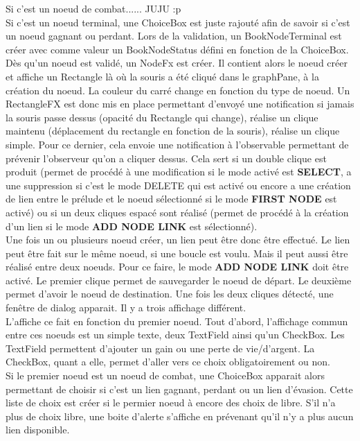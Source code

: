 		Si c'est un noeud de combat...... JUJU  :p\\


		Si c'est un noeud terminal, une ChoiceBox est juste rajouté afin de savoir si c'est un noeud gagnant ou perdant. Lors de la validation, un BookNodeTerminal est créer avec comme valeur un BookNodeStatus défini en fonction de la ChoiceBox.\\

		Dès qu'un noeud est validé, un NodeFx est créer. Il contient alors le noeud créer et affiche un Rectangle là où la souris a été cliqué dans le graphPane, à la création du noeud. La couleur du carré change en fonction du type de noeud. Un RectangleFX est donc mis en place permettant d'envoyé une notification si jamais la souris passe dessus (opacité du Rectangle qui change), réalise un clique maintenu (déplacement du rectangle en fonction de la souris), réalise un clique simple. Pour ce dernier, cela envoie une notification à l'observable permettant de prévenir l'observeur qu'on a cliquer dessus. Cela sert si un double clique est produit (permet de procédé à une modification si le mode activé est \textbf{SELECT}, a une suppression si c'est le mode DELETE qui est activé ou encore a une création de lien entre le prélude et le noeud sélectionné si le mode \textbf{FIRST NODE} est activé) ou si un deux cliques espacé sont réalisé (permet de procédé à la création d'un lien si le mode \textbf{ADD NODE LINK} est sélectionné).\\

		Une fois un ou plusieurs noeud créer, un lien peut être donc être effectué. Le lien peut être fait sur le même noeud, si une boucle est voulu. Mais il peut aussi être réalisé entre deux noeuds. Pour ce faire, le mode \textbf{ADD NODE LINK} doit être activé. Le premier clique permet de sauvegarder le noeud de départ. Le deuxième permet d'avoir le noeud de destination. Une fois les deux cliques détecté, une fenêtre de dialog apparait. Il y a trois affichage différent.\\
		L'affiche ce fait en fonction du premier noeud. Tout d'abord, l'affichage commun entre ces noeuds est un simple texte, deux TextField ainsi qu'un CheckBox. Les TextField permettent d'ajouter un gain ou une perte de vie/d'argent. La CheckBox, quant a elle, permet d'aller vers ce choix obligatoirement ou non.\\
		Si le premier noeud est un noeud de combat, une ChoiceBox apparait alors permettant de choisir si c'est un lien gagnant, perdant ou un lien d'évasion. Cette liste de choix est créer si le permier noeud à encore des choix de libre. S'il n'a plus de choix libre, une boite d'alerte s'affiche en prévenant qu'il n'y a plus aucun lien disponible.\\


